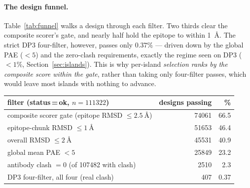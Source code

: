 \paragraph{The design funnel.}
Table~\ref{tab:funnel} walks a design through each filter. Two thirds clear the composite
scorer's gate, and nearly half hold the epitope to within \SI{1}{\angstrom}. The strict DP3
four-filter, however, passes only $0.37\%$ --- driven down by the global PAE ($<5$) and the
zero-clash requirements, exactly the regime seen on DP3 ($<1\%$, Section~\ref{sec:islands}).
This is why per-island \emph{selection ranks by the composite score within the gate}, rather
than taking only four-filter passes, which would leave most islands with nothing to advance.

\begin{center}
\begin{tabular}{lrr}
\toprule
filter (status\,=\,ok, $n=\num{111322}$) & designs passing & \% \\
\midrule
composite scorer gate (epitope RMSD $\le \SI{2.5}{\angstrom}$) & \num{74061} & 66.5 \\
\quad epitope-chunk RMSD $\le \SI{1}{\angstrom}$              & \num{51653} & 46.4 \\
\quad overall RMSD $\le \SI{2}{\angstrom}$                    & \num{45531} & 40.9 \\
\quad global mean PAE $< 5$                                   & \num{25849} & 23.2 \\
\quad antibody clash $= 0$ (of \num{107482} with clash)      & \num{2510}  & 2.3 \\
\midrule
DP3 four-filter, all four (real clash) & \num{407} & 0.37 \\
\bottomrule
\end{tabular}
\label{tab:funnel}
\end{center}

